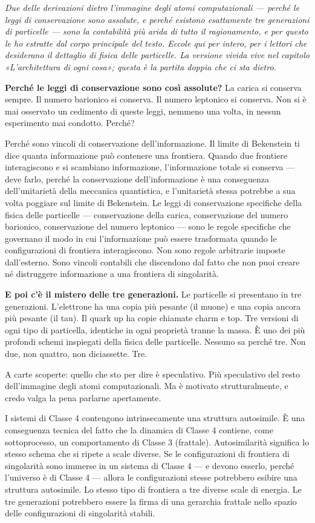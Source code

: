 \documentclass[11pt, twoside, openright]{book}
\begin{document}
\textit{Due delle derivazioni dietro l'immagine degli atomi computazionali --- perché le leggi di conservazione sono assolute, e perché esistono esattamente tre generazioni di particelle --- sono la contabilità più arida di tutto il ragionamento, e per questo le ho estratte dal corpo principale del testo. Eccole qui per intero, per i lettori che desiderano il dettaglio di fisica delle particelle. La versione vivida vive nel capitolo «L'architettura di ogni cosa»; questa è la partita doppia che ci sta dietro.}

\textbf{Perché le leggi di conservazione sono così assolute?} La carica si conserva sempre. Il numero barionico si conserva. Il numero leptonico si conserva. Non si è mai osservato un cedimento di queste leggi, nemmeno una volta, in nessun esperimento mai condotto. Perché?

Perché sono vincoli di conservazione dell'informazione. Il limite di Bekenstein ti dice quanta informazione può contenere una frontiera. Quando due frontiere interagiscono e si scambiano informazione, l'informazione totale si conserva --- deve farlo, perché la conservazione dell'informazione è una conseguenza dell'unitarietà della meccanica quantistica, e l'unitarietà stessa potrebbe a sua volta poggiare sul limite di Bekenstein. Le leggi di conservazione specifiche della fisica delle particelle --- conservazione della carica, conservazione del numero barionico, conservazione del numero leptonico --- sono le regole specifiche che governano il modo in cui l'informazione può essere trasformata quando le configurazioni di frontiera interagiscono. Non sono regole arbitrarie imposte dall'esterno. Sono vincoli contabili che discendono dal fatto che non puoi creare né distruggere informazione a una frontiera di singolarità.

\textbf{E poi c'è il mistero delle tre generazioni.} Le particelle si presentano in tre generazioni. L'elettrone ha una copia più pesante (il muone) e una copia ancora più pesante (il tau). Il quark up ha copie chiamate charm e top. Tre versioni di ogni tipo di particella, identiche in ogni proprietà tranne la massa. È uno dei più profondi schemi inspiegati della fisica delle particelle. Nessuno sa perché tre. Non due, non quattro, non diciassette. Tre.

A carte scoperte: quello che sto per dire è speculativo. Più speculativo del resto dell'immagine degli atomi computazionali. Ma è motivato strutturalmente, e credo valga la pena parlarne apertamente.

I sistemi di Classe 4 contengono intrinsecamente una struttura autosimile. È una conseguenza tecnica del fatto che la dinamica di Classe 4 contiene, come sottoprocesso, un comportamento di Classe 3 (frattale). Autosimilarità significa lo stesso schema che si ripete a scale diverse. Se le configurazioni di frontiera di singolarità sono immerse in un sistema di Classe 4 --- e devono esserlo, perché l'universo è di Classe 4 --- allora le configurazioni stesse potrebbero esibire una struttura autosimile. Lo stesso tipo di frontiera a tre diverse scale di energia. Le tre generazioni potrebbero essere la firma di una gerarchia frattale nello spazio delle configurazioni di singolarità stabili.
\end{document}
